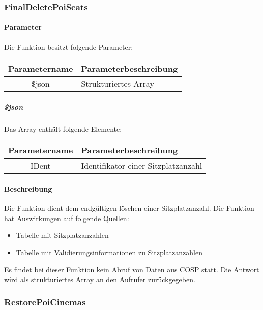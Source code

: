 \subsubsection{FinalDeletePoiSeats}
\paragraph{Parameter} Die Funktion besitzt folgende Parameter:
\begin{table}[H]
	\begin{tabular}{|c|p{11cm}|}
		\hline
		\textbf{Parametername} & \textbf{Parameterbeschreibung} \\ \hline
		\$json & Strukturiertes Array \\ \hline
	\end{tabular}
\end{table}
\subparagraph{\$json}Das Array enthält folgende Elemente:
\begin{table}[H]
	\begin{tabular}{|c|p{11cm}|}
		\hline
		\textbf{Parametername} & \textbf{Parameterbeschreibung} \\ \hline
		IDent & Identifikator einer Sitzplatzanzahl \\ \hline
	\end{tabular}
\end{table}
\paragraph{Beschreibung} Die Funktion dient dem endgültigen löschen einer Sitzplatzanzahl. Die Funktion hat Auswirkungen auf folgende Quellen:
\begin{itemize}
	\item Tabelle mit Sitzplatzanzahlen
	\item Tabelle mit Validierungsinformationen zu Sitzplatzanzahlen
\end{itemize}
Es findet bei dieser Funktion kein Abruf von Daten aus {\glqq COSP\grqq} statt. Die Antwort wird als strukturiertes Array an den Aufrufer zurückgegeben.
\subsubsection{RestorePoiCinemas}
